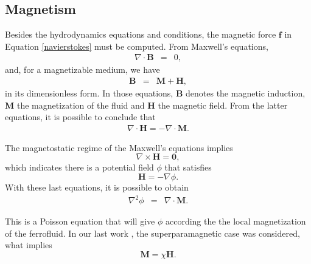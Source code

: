 \documentclass[journal]{IEEEtran}
\begin{document}
\subsection{Magnetism}
Besides the hydrodynamics equations and conditions, the magnetic force $\mathbf{f}$ in Equation \ref{navierstokes} must be computed. From Maxwell's equations, \begin{eqnarray}
\nabla\cdot \mathbf{B} & = & 0\label{secondmagneticequation},
\end{eqnarray} and, for a magnetizable medium, we have \begin{eqnarray}
\mathbf{B} &=& \mathbf{M}+\mathbf{H},\label{firstmagneticequation}
\end{eqnarray}
in its dimensionless form. In those equations, $\mathbf{B}$ denotes the magnetic induction, $\mathbf{M}$ the magnetization of the fluid and $\mathbf{H}$ the magnetic field. From the latter equations, it is possible to conclude that \begin{eqnarray}
\nabla\cdot\mathbf{H} = -\nabla\cdot \mathbf{M}\label{mh1}.
\end{eqnarray}

The magnetostatic regime of the Maxwell's equations implies \begin{equation}\nabla\times \mathbf{H} = \mathbf{0},
\end{equation} which indicates there is a potential field $\phi$ that satisfies \begin{equation}\mathbf{H} = -\nabla \phi.\label{Hphipotencial}\end{equation} With these last equations, it is possible to obtain \begin{eqnarray}
\nabla^2\phi &=& \nabla\cdot \mathbf{M}.\label{eqcampomag}
\end{eqnarray}

This is a Poisson equation that will give $\phi$ according the the local magnetization of the ferrofluid. In our last work \cite{ataias2015}, the superparamagnetic case was considered, what implies \begin{equation}\mathbf{M} = \chi \mathbf{H}.\end{equation}
\end{document}
